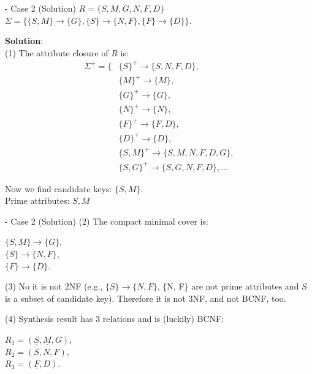 \begin{frame}[fragile]{ - Case 2 (Solution)}
	$R = \{S, M, G, N, F, D\}$\\
	$\Sigma = \{\{S, M\} \rightarrow \{G\}, 
	\{S\} \rightarrow \{N, F\},
	\{F\} \rightarrow \{D\}\}$.\\\vspace{5pt}
	
	\textbf{Solution}:\\
	(1) The attribute closure of $R$ is:
	\begin{align*} 
		\Sigma^{+} = \{&\{S\}^{+} \rightarrow \{S, N, F, D\},\\
		&\{M\}^{+} \rightarrow \{M\},\\
		&\{G\}^{+} \rightarrow \{G\},\\
		&\{N\}^{+} \rightarrow \{N\},\\
		&\{F\}^{+} \rightarrow \{F, D\},\\
		&\{D\}^{+} \rightarrow \{D\},\\
		&\{{S, M}\}^{+} \rightarrow \{S, M, N, F, D, G\},\\
		&\{{S, G}\}^{+} \rightarrow \{S, G, N, F, D\}, ...
	\end{align*} 
	
	Now we find candidate keys: $\{S, M\}$.\\
	Prime attributes: $S, M$
\end{frame}

\begin{frame}[fragile]{ - Case 2 (Solution)}
	(2) The compact minimal cover is:\\\vspace{5pt}
	
	$\{S, M\} \rightarrow \{G\},$\\
	$\{S\}  \rightarrow \{N, F\},$\\
	$\{F\} \rightarrow \{D\}.$\\\vspace{5pt}
	
	(3)  No it is not 2NF (e.g., $\{S\}\rightarrow\{N, F\}$, \{N, F\} are not prime attributes and $S$ is a subset of candidate key). Therefore it is not 3NF, and not BCNF, too.\\\vspace{5pt}
	
	(4) Synthesis result has 3 relations and is (luckily) BCNF: \\\vspace{5pt}
	
	$R_1 = (\underline{S}, \underline{M}, G),$\\
	$R_2 = (\underline{S}, N, F),$\\
	$R_3 = (\underline{F}, D).$\\\vspace{5pt}
	
\end{frame}

